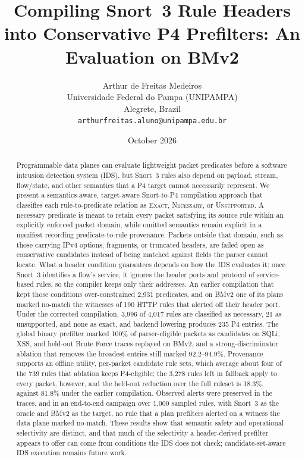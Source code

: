 \documentclass{article}
\title{Compiling Snort~3 Rule Headers into Conservative P4 Prefilters: An Evaluation on BMv2}
\author{
  Arthur de Freitas Medeiros\\
  Universidade Federal do Pampa (UNIPAMPA)\\
  Alegrete, Brazil\\
  \texttt{arthurfreitas.aluno@unipampa.edu.br}
}
\date{October 2026}
\begin{document}
\maketitle

\begin{abstract}
Programmable data planes can evaluate lightweight packet predicates before a
software intrusion detection system (IDS), but Snort~3 rules also depend on
payload, stream, flow/state, and other semantics that a P4 target cannot
necessarily represent. We present a semantics-aware, target-aware
Snort-to-P4 compilation approach that classifies each rule-to-predicate
relation as \textsc{Exact}, \textsc{Necessary}, or \textsc{Unsupported}.
A necessary predicate is meant to retain every packet satisfying its source
rule within an explicitly enforced packet domain, while omitted semantics
remain explicit in a manifest recording predicate-to-rule provenance.
Packets outside that domain, such as those carrying IPv4 options, fragments,
or truncated headers, are failed open as conservative candidates instead of
being matched against fields the parser cannot locate. What a header
condition guarantees depends on how the IDS evaluates it: once Snort~3
identifies a flow's service, it ignores the header ports and protocol of
service-based rules, so the compiler keeps only their addresses. An earlier
compilation that kept those conditions over-constrained 2,931 predicates,
and on BMv2 one of its plans marked no-match the witnesses of 190 HTTP rules
that alerted off their header port. Under the corrected
compilation, 3,996 of 4,017 rules are classified as necessary, 21 as
unsupported, and none as exact, and backend lowering produces 235 P4
entries. The global binary prefilter marked 100\% of parser-eligible packets
as candidates on SQLi, XSS, and held-out Brute Force traces replayed on BMv2,
and a strong-discriminator ablation that removes the broadest entries still
marked 92.2--94.9\%. Provenance supports an offline utility, per-packet
candidate rule sets, which average about four of the 739 rules that ablation
keeps P4-eligible; the 3,278 rules left in fallback apply to every packet,
however, and the held-out reduction over the full ruleset is 18.3\%, against
81.8\% under the earlier compilation. Observed alerts were preserved in the traces,
and in an end-to-end campaign over 1,000 sampled rules, with Snort~3 as the
oracle and BMv2 as the target, no rule that a plan prefilters alerted on a
witness the data plane marked no-match. These results show that semantic
safety and operational selectivity are distinct, and that much of the
selectivity a header-derived prefilter appears to offer can come from
conditions the IDS does not check; candidate-set-aware IDS execution remains
future work.
\end{abstract}
\end{document}
